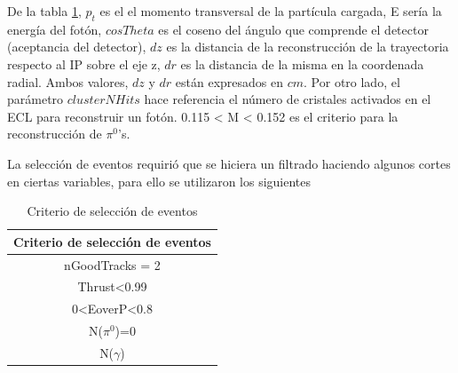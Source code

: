 De la tabla \ref{table:crite}, \(p_t\) es el el momento transversal de la partícula cargada, E sería la energía del fotón, \(cosTheta\) es el coseno del ángulo que comprende el detector (aceptancia del detector), \(dz\) es la distancia de la reconstrucción de la trayectoria respecto al IP sobre el eje z, \(dr\) es la distancia de la misma en la coordenada radial. Ambos valores, \(dz\) y \(dr\) están expresados en \(cm\). Por otro lado, el parámetro \(clusterNHits\) hace referencia el número de cristales activados en el ECL para reconstruir un fotón. 0.115 < M < 0.152 es el criterio para la reconstrucción de \(\pi^0\)'s. 

La selección de eventos requirió que se hiciera un filtrado haciendo algunos cortes en ciertas variables, para ello se utilizaron los siguientes \begin{table}[h!]
\centering
 \begin{tabular}{||c||} 
 \hline
 Criterio de selección de eventos \\ [0.5ex] 
 \hline\hline
 nGoodTracks = 2 \\ 
 \hline
 Thrust<0.99 \\
 \hline
 0<EoverP<0.8 \\
 \hline
 N(\(\pi^0\))=0\\
 \hline
 N(\(\gamma\))\leq1\\
 \hline
 \end{tabular}
 \caption{\small{Criterio de selección de eventos}}\label{table:crite}
\end{table}

